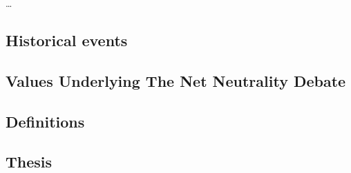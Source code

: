 \ldots

\subsection{Historical events}
\label{sec:intro_problem}


\subsection{Values Underlying The Net Neutrality Debate}
\label{sec:values}


\subsection{Definitions}
\label{sec:intro_def}


\subsection{Thesis}
\label{sec:intro_thesis}
